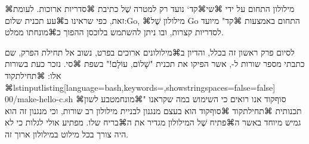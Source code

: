 ⌘מילולון התחום על ידי ⌘שי{⌘קד{`}} נועד רק למטרה שֶׁל כתיבת ⌘סדריות ארוכות. לעומת
זאת, כפי שראינו ב⌘עע תכנית שלום:Go, ⌘מילולון שֶׁל Go התחום באמצעות ⌘קד{"} מיועד
לסדריות קצרות, ובו ניתן להשתמש בלוכסן ההפוך כ⌘מונח{תו ממלט}.

לסיום פרק ראשון זה בכלל, והדיון ב⌘מילולונים ארוכים בפרט, נשוב אל תחילת הפרק,
שם כתבתי מספר שורות ל-, אשר הפיקו את תכנית "שָׁלוֹם, עוֹלָם!" בשפת ⌘סי.
נזכר כעת בשורות אלו:
⌘תחילת{קוד}
\lstset{basicstyle=\listingsfont\codesize}
⌘lstinputlisting[language=bash,keywords={},showstringspaces=false=false]
{00/make-hello-c.sh}
⌘סוף{קוד}
אנו רואים כי השימוש במה שקראנו "⌘מונח{מטבע לשון תכנותית}
⌘תחילת{קוד}
⌘סוף{קוד}
הוא בעצם מנגנון
לבניית מילולון רב שורות, וכי מנגנון זה הוא גמיש מיוחד באשר ה⌘פתיח שֶׁל המילולון
מגדיר את ה⌘בריח שלו. מפתיע אולי לגלות כי לא היה צורך בכל
מילוט במילולון ארוך זה.

